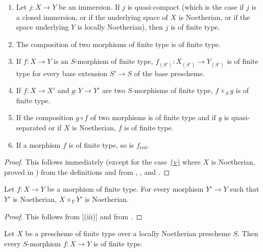 \begin{proposition}[1.5.4]
\label{IV.1.5.4}
\begin{enumerate}
  \item[\rm(i)] Let $j:X\to Y$ be an immersion.
  If $j$ is quasi-compact (which is the case if $j$ is a closed immersion, or if the underlying space of $X$ is Noetherian, or if the space underlying $Y$ is locally Noetherian), then $j$ is of finite type.
  \item[\rm(ii)] The composition of two morphisms of finite type is of finite type.
  \item[\rm(iii)] If $f:X\to Y$ is an $S$-morphism of finite type, $f_{(S')}:X_{(S')}\to Y_{(S')}$ is of finite type for every base extension $S'\to S$ of the base prescheme.
  \item[\rm(iv)] If $f:X\to X'$ and $g:Y\to Y'$ are two $S$-morphisms of finite type, $f\times_S g$ is of finite type.
  \item[\rm(v)] If the composition $g\circ f$ of two morphisms is of finite type and if $g$ is quasi-separated or if $X$ is Noetherian, $f$ is of finite type.
  \item[\rm(vi)] If a morphism $f$ is of finite type, so is $f_{\mathrm{red}}$.
\end{enumerate}
\end{proposition}

\begin{proof}
This follows immediately (except for the case~\hyperref[IV.1.5.4]{(v)} where $X$ is Noetherian, proved in ) from the definitions and from , , and .
\end{proof}

\begin{corollary}[1.5.5]
\label{IV.1.5.5}
Let $f:X\to Y$ be a morphism of finite type.
For every morphism $Y'\to Y$ such that $Y'$ is Noetherian, $X\times_Y Y'$ is Noetherian.
\end{corollary}

\begin{proof}
This follows from [(iii)] and from .
\end{proof}

\begin{corollary}[1.5.6]
\label{IV.1.5.6}
Let $X$ be a prescheme of finite type over a locally Noetherian prescheme $S$.
Then every $S$-morphism $f:X\to Y$ is of finite type.
\end{corollary}

